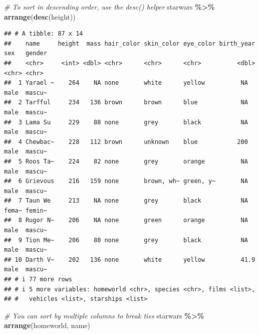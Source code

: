 \documentclass[
  11pt,
]{article}
\newenvironment{Shaded}{\begin{snugshade}}{\end{snugshade}}
\newcommand{\CommentTok}[1]{\textcolor[rgb]{0.56,0.35,0.01}{\textit{#1}}}
\newcommand{\FunctionTok}[1]{\textcolor[rgb]{0.13,0.29,0.53}{\textbf{#1}}}
\newcommand{\NormalTok}[1]{#1}
\newcommand{\SpecialCharTok}[1]{\textcolor[rgb]{0.81,0.36,0.00}{\textbf{#1}}}
\begin{document}
\begin{Shaded}
\begin{Highlighting}[]
\CommentTok{\# To sort in descending order, use the desc() helper}
\NormalTok{starwars }\SpecialCharTok{\%\textgreater{}\%} 
  \FunctionTok{arrange}\NormalTok{(}\FunctionTok{desc}\NormalTok{(height))}
\end{Highlighting}
\end{Shaded}

\begin{verbatim}
## # A tibble: 87 x 14
##    name     height  mass hair_color skin_color eye_color birth_year sex   gender
##    <chr>     <int> <dbl> <chr>      <chr>      <chr>          <dbl> <chr> <chr> 
##  1 Yarael ~    264    NA none       white      yellow          NA   male  mascu~
##  2 Tarfful     234   136 brown      brown      blue            NA   male  mascu~
##  3 Lama Su     229    88 none       grey       black           NA   male  mascu~
##  4 Chewbac~    228   112 brown      unknown    blue           200   male  mascu~
##  5 Roos Ta~    224    82 none       grey       orange          NA   male  mascu~
##  6 Grievous    216   159 none       brown, wh~ green, y~       NA   male  mascu~
##  7 Taun We     213    NA none       grey       black           NA   fema~ femin~
##  8 Rugor N~    206    NA none       green      orange          NA   male  mascu~
##  9 Tion Me~    206    80 none       grey       black           NA   male  mascu~
## 10 Darth V~    202   136 none       white      yellow          41.9 male  mascu~
## # i 77 more rows
## # i 5 more variables: homeworld <chr>, species <chr>, films <list>,
## #   vehicles <list>, starships <list>
\end{verbatim}

\begin{Shaded}
\begin{Highlighting}[]
\CommentTok{\# You can sort by multiple columns to break ties}
\NormalTok{starwars }\SpecialCharTok{\%\textgreater{}\%} 
  \FunctionTok{arrange}\NormalTok{(homeworld, name)}
\end{Highlighting}
\end{Shaded}
\end{document}
